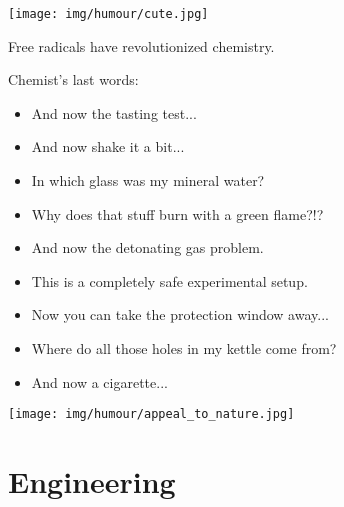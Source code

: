 	\begin{center}
	\texttt{[image: img/humour/cute.jpg]}
	\end{center}

	\begin{center}\underline{\hspace{5 cm}}\end{center}

	Free radicals have revolutionized chemistry.

	\begin{center}\underline{\hspace{5 cm}}\end{center}

	Chemist's last words: 
	
	\begin{itemize}
		\item And now the tasting test... 
	
		\item And now shake it a bit... 
	
		\item In which glass was my mineral water? 
	
		\item Why does that stuff burn with a green flame?!? 
	
		\item And now the detonating gas problem. 
	
		\item This is a completely safe experimental setup. 
	
		\item Now you can take the protection window away... 
	
		\item Where do all those holes in my kettle come from? 
	
		\item And now a cigarette... 
	\end{itemize}

	\begin{center}\underline{\hspace{5 cm}}\end{center}
	
	\begin{center}
	\texttt{[image: img/humour/appeal\_to\_nature.jpg]}
	\end{center}

	\pagebreak
	\section{Engineering}

